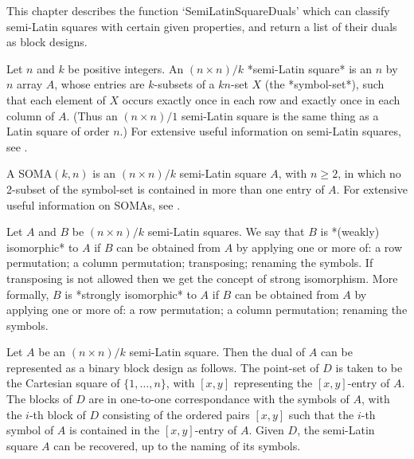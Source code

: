 %
%
%
%
\def\GRAPE{\sf GRAPE}
\def\DESIGN{\sf DESIGN}
\def\nauty{\it nauty}
\def\Aut{{\rm Aut}\,} 


This chapter describes the function `SemiLatinSquareDuals' which can
classify semi-Latin squares with certain given properties, and return
a list of their duals as block designs.


Let $n$ and $k$ be positive integers. An $(n\times n)/k$ *semi-Latin
square*
is an $n$ by $n$ array $A$, whose
entries are $k$-subsets of a $kn$-set $X$ (the *symbol-set*), such that
each element of $X$ occurs exactly once in each row and exactly once in
each column of $A$. (Thus an $(n\times n)/1$ semi-Latin square is the same
thing as a Latin square of order $n$.) For extensive useful information on
semi-Latin squares, see .

A SOMA$(k,n)$
is an $(n\times n)/k$ semi-Latin square $A$,
with $n\ge2$, in which no 2-subset of the symbol-set is contained in
more than one entry of $A$.  For extensive useful information on SOMAs,
see .

Let $A$ and $B$ be $(n\times n)/k$ semi-Latin squares.  We say that
$B$ is *(weakly) isomorphic* to $A$ if $B$ can be obtained from $A$
by applying one or more of: a row permutation; a column permutation;
transposing; renaming the symbols. If transposing is not allowed then we
get the concept of strong isomorphism. More formally, $B$ is *strongly
isomorphic* to $A$ if $B$ can be obtained from $A$ by applying one or
more of: a row permutation; a column permutation; renaming the symbols.

Let $A$ be an $(n\times n)/k$  semi-Latin square.  Then the dual of $A$
can be represented as a binary block design as follows. The point-set of
$D$ is taken to be the Cartesian square of $\{1,\ldots,n\}$, with $[x,y]$
representing the $[x,y]$-entry of $A$. The blocks of $D$ are in one-to-one
correspondance with the symbols of $A$, with the $i$-th block of $D$
consisting of the ordered pairs $[x,y]$ such that the $i$-th symbol of
$A$ is contained in the $[x,y]$-entry of $A$. Given $D$, the semi-Latin
square $A$ can be recovered, up to the naming of its symbols.

